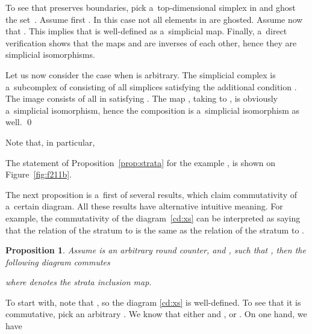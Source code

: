 \documentclass{amsart}[10pt]
\newtheorem{prop}[theorem]{Proposition}
\newcommand{\pr}{\nin{\bf Proof.} }
\numberwithin{equation}{section}
\numberwithin{figure}{section}
\numberwithin{table}{section}
\begin{document}
To see that  preserves boundaries, pick a~top-dimensional
simplex  in  and ghost the
set~. Assume first . In this case not all
elements in  are ghosted. Assume now that . This
implies that  is well-defined as a~simplicial map.  Finally,
a~direct verification shows that the maps  and  are
inverses of each other, hence they are simplicial isomorphisms.

Let us now consider the case when  is arbitrary. The simplicial
complex  is a~subcomplex of  consisting of all simplices
 satisfying the additional condition . The
image  consists of all
 in  satisfying
. The map , taking  to , is obviously a~simplicial isomorphism,
hence the composition
 is
a~simplicial isomorphism as well.  \qed

\vskip5pt

\nin Note that, in particular,

\nin The statement of Proposition~\ref{prop:strata} for the example
, is shown on Figure~\ref{fig:f211b}.

The next proposition is a~first of several results, which claim
commutativity of a~certain diagram. All these results have alternative
intuitive meaning. For example, the commutativity of the
diagram~\eqref{cd:xs} can be interpreted as saying that the relation of
the stratum  to  is the same as the
relation of the stratum  to .

\begin{prop}\label{prop:cxs}
Assume  is an arbitrary round counter, and ,
such that , then the following diagram commutes

where  denotes the strata inclusion map.
\end{prop}
\pr To start with, note that , so the diagram \eqref{cd:xs} is
well-defined. To see that it is commutative, pick an arbitrary
. We know that either  and , or . On one
hand, we have
\end{document}
